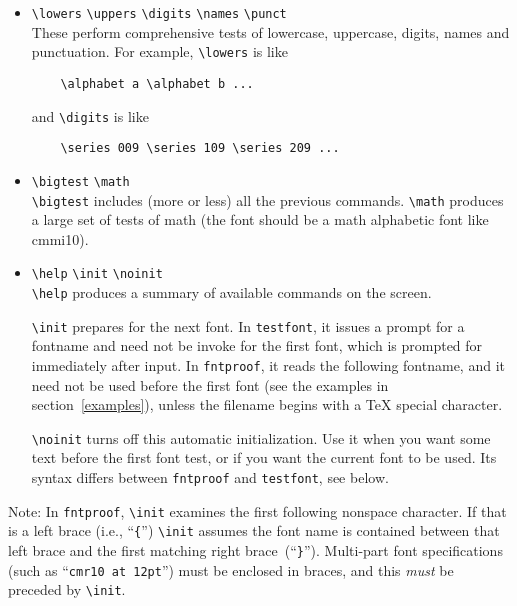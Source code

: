 \documentclass[draft]{article}
\newcommand\file[1]{\texttt{#1}}
\renewcommand\"{\verb"}
\begin{document}
{\begin{itemize}
 \item  \"\lowers" \"\uppers" \"\digits" \"\names"
        \"\punct"\\
        These perform comprehensive tests of lowercase, uppercase,
        digits, names and punctuation. For example, \"\lowers" is
        like
\begin{verbatim}
    \alphabet a \alphabet b ...
\end{verbatim}

        and \"\digits" is like
\begin{verbatim}
    \series 009 \series 109 \series 209 ...
\end{verbatim}

 \item  \"\bigtest" \"\math"\\
        \"\bigtest" includes (more or less) all the previous
        commands. \"\math" produces a large set of tests of math
        (the font should be a math alphabetic font like cmmi10). 

 \item  \"\help" \"\init" \"\noinit"\\
        \"\help" produces a summary of available commands on the screen. 

        \"\init" prepares for the next font. In \file{testfont}, it 
        issues a prompt for a fontname and need not be invoke for the 
        first font, which is prompted for immediately after input. 
        In \file{fntproof}, it reads the following fontname, and it need 
        not be used before the first font (see the examples in
        section~\ref{examples}), unless the filename begins with a 
        \TeX{} special character. 

        \"\noinit" turns off this automatic initialization. Use it when 
        you want some text before the first font test, or if you want 
        the current font to be used. Its syntax differs between 
        \file{fntproof} and \file{testfont}, see below.
\end{itemize}

Note: In \file{fntproof}, \"\init" examines the first following
nonspace character. If that is a left brace (i.e., ``\"{"'')
\"\init" assumes the font name is contained between that left brace
and the first matching right brace~(``\"}"'').
Multi-part font specifications (such as ``\"cmr10 at 12pt"'') must be
enclosed in braces, and this \emph{must} be preceded by \"\init".

}
\end{document}
